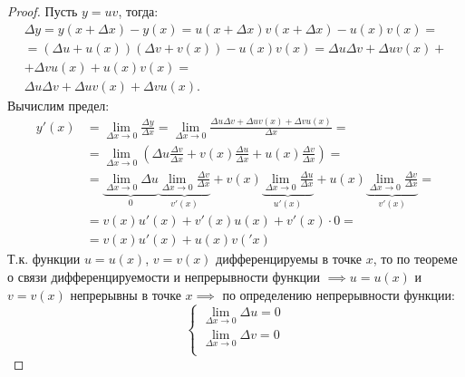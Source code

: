 \begin{proof}
  Пусть $y = uv$, тогда:
  \begin{gather*}
    \Delta  y = y(x + \Delta x) - y(x) = u(x + \Delta x) v(x + \Delta x) - u(x) v(x) = \\
    = (\Delta u + u(x))(\Delta v + v(x)) - u(x) v(x) = \Delta u \Delta v + \Delta u v(x) + \\
    + \Delta v u(x) + u(x) v (x) = \\
    \Delta u \Delta v + \Delta u v(x) + \Delta v u(x).
  \end{gather*}
  Вычислим предел:
  \begin{align*}
    y'(x) &= \lim_{\Delta x \to 0} \frac{\Delta y}{\Delta x} 
           = \lim_{\Delta x \to 0}  \frac{ \Delta u \Delta v + \Delta  u v(x) + \Delta v u(x)}{\Delta x} = \\
          &= \lim_{\Delta x \to 0} \left( \Delta u \frac{\Delta v}{\Delta x} + v(x) \frac{\Delta u}{\Delta x} + u(x) \frac{\Delta v}{\Delta x} \right) = \\
          &= \underbrace{\lim_{\Delta x \to 0} \Delta u}_{0} \underbrace{\lim_{\Delta x \to 0} \frac{\Delta v}{\Delta x}}_{v'(x)} + v(x) \underbrace{\lim_{\Delta x \to 0} \frac{\Delta u}{\Delta x}}_{u'(x)} + u(x)\underbrace{\lim_{\Delta x \to 0} \frac{\Delta v}{\Delta x}}_{v'(x)} = \\
          &= v(x) u'(x) + v'(x) u(x) + v'(x) \cdot 0 = \\
          &= \boxed{v(x) u'(x) + u(x) v('x)}
  \end{align*}
  Т.к. функции $u = u(x)$, $v = v(x)$ дифференцируемы в точке $x$, то по теореме о связи дифференцируемости и непрерывности функции  $\implies u = u(x)$ и $v = v(x)$ непрерывны в точке  $x \implies$ по определению непрерывности функции: \[
     \begin{cases}
       \lim_{\Delta x \to 0} \Delta u = 0 \\
       \lim_{\Delta x \to 0} \Delta v = 0 \\
     \end{cases}
  \] 
\end{proof}

